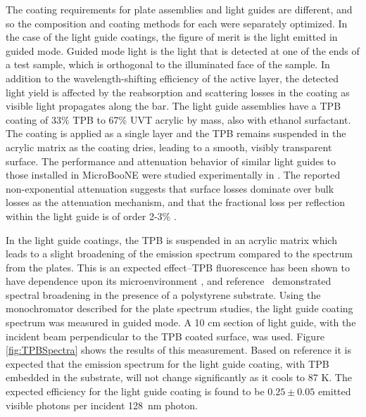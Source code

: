 The coating requirements for plate assemblies and light guides are different, and so the composition and coating methods for each were separately optimized.    In the case of the light guide coatings, the figure of merit is the light emitted in guided mode.  Guided mode light is the light that is detected at one of the ends of a test sample, which is orthogonal to the illuminated face of the sample.  In addition to the wavelength-shifting efficiency of the active layer, the detected light yield is affected by the reabsorption and scattering losses in the coating as visible light propagates along the bar. The light guide assemblies have a TPB coating of 33\% TPB to 67\% UVT acrylic by mass, also with ethanol surfactant. The coating is applied as a single layer and the TPB remains suspended in the acrylic matrix as the coating dries, leading to a smooth, visibly transparent surface.  The performance and attenuation behavior of similar light guides to those installed in MicroBooNE were studied experimentally in \cite{Baptista:2012}.  The reported non-exponential attenuation suggests that surface losses dominate over bulk losses as the attenuation mechanism, and that the fractional loss per reflection within the light guide is of order 2-3\% \cite{Jones:2013}. 

In the light guide coatings, the TPB is suspended in an acrylic matrix which leads to a slight broadening of the emission spectrum compared to the spectrum from the plates. This is an expected effect--TPB fluorescence has been shown to have dependence upon its microenvironment \cite{Birks:1959,Birks:1961,Francini:2013-jinst,Hanagodimath:2008, Liu:1997}, and reference~\cite{Francini:2013-jinst} demonstrated spectral broadening in the presence of a polystyrene substrate.  Using the monochromator described for the plate spectrum studies, the light guide coating spectrum was measured in guided mode. A 10 cm section of light guide, with the incident beam perpendicular to the TPB coated surface, was used.  Figure \ref{fig:TPBSpectra} shows the results of this measurement.  Based on reference \cite{Francini:2013-jinst} it is expected that the emission spectrum for the light guide coating, with TPB embedded in the substrate, will not change significantly as it cools to 87 K.  The expected efficiency for the light guide coating is found to be $0.25 \pm 0.05$ emitted visible photons per incident 128~nm photon.

